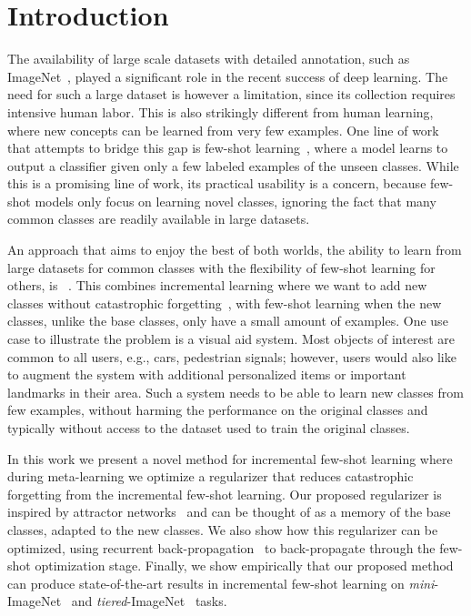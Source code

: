 \section{Introduction}
The availability of large scale datasets with detailed annotation, such as
ImageNet~\citep{imagenet}, played a significant role in the recent success of deep learning. The
need for such a large dataset is however a limitation, since its collection requires intensive human
labor. This is also strikingly different from human learning, where new concepts can be learned from
very few examples. One line of work that attempts to bridge this gap is few-shot
learning~\citep{koch2015siamese,matching,proto}, where a model learns to output a classifier given
only a few labeled examples of the unseen classes. While this is a promising line of work, its
practical usability is a concern, because few-shot models only focus on learning novel classes,
ignoring the fact that many common classes are readily available in large datasets.

An approach that aims to enjoy the best of both worlds, the ability to learn from large datasets for
common classes with the flexibility of few-shot learning for others, is {\it \ourproblemsmall}~\citep{lwof}. This combines incremental learning where we want to add new classes without
catastrophic forgetting~\citep{mccloskey1989catastrophic}, with few-shot learning when the new
classes, unlike the base classes, only have a small amount of examples. One use case to illustrate
the problem is a visual aid system. Most objects of interest are common to all users, e.g., cars,
pedestrian signals; however, users would also like to augment the system with additional
personalized items or important landmarks in their area. Such a system needs to be able to learn new
classes from few examples, without harming the performance on the original classes and typically
without access to the dataset used to train the original classes.

In this work we present a novel method for incremental few-shot learning where during meta-learning
we optimize a regularizer that reduces catastrophic forgetting from the incremental few-shot
learning. Our proposed regularizer is inspired by attractor networks~\citep{localist} and can be
thought of as a memory of the base classes, adapted to the new classes. We also show how this
regularizer can be optimized, using recurrent back-propagation~\citep{rbp,rbp2,rbp3} to
back-propagate through the few-shot optimization stage. Finally, we show empirically that our
proposed method can produce state-of-the-art results in incremental few-shot learning on {\it
mini}-ImageNet~\citep{matching} and {\it tiered}-ImageNet~\citep{fewshotssl} tasks.
